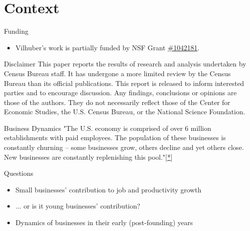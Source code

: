 \section{Context}
\begin{frame}
\begin{block}{Funding}
\begin{itemize}
\item Vilhuber's work is partially funded by NSF Grant \href{http://www.nsf.gov/awardsearch/showAward.do?AwardNumber=1042181}{\#1042181}. 
\end{itemize}
\end{block}
\begin{block}{Disclaimer}
This paper reports the results of research and analysis 
undertaken by Census Bureau staff. It has undergone a more limited review by the Census Bureau than its 
official publications. This report is released to inform interested parties and to encourage discussion. Any 
findings, conclusions or opinions are those of the authors. They do not necessarily reflect those of the Center for 
Economic Studies, the U.S. Census Bureau, or the National Science Foundation. 
\end{block}
\end{frame}


\begin{frame}
\begin{block}{Business Dynamics}
"The U.S. economy is comprised of over 6 million establishments with paid employees. The population of these businesses is constantly churning -- some businesses grow, others decline and yet others close. New businesses are constantly replenishing this pool."[\href{https://www.census.gov/ces/dataproducts/bds/overview.html}{*}]
\end{block}
\begin{block}{Questions}
\begin{itemize}
\item Small businesses' contribution to job and productivity growth 
\item ... or is it \alert{young} businesses' contribution?
\item Dynamics of businesses in their early (post-founding) years
\end{itemize}
\end{block}
\end{frame}

